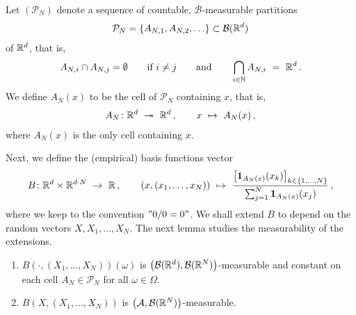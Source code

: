 Let $
\left(
\mathcal{P}_N
\right)
$
denote a sequence of countable, $\mathcal{B}$-measurable partitions 
\begin{align*}
\mathcal{P}_N= \left\{
  A_{N,1},
  A_{N,2},
  \ldots
\right\}
\subset \mathcal{B}(\mathbb{R}^d)
\end{align*}
of $\mathbb{R}^d$, that is, 
\begin{align*}
  A_{N,i}\cap A_{N,j}=\emptyset
  \qquad
  \text{if}\ i\neq j
  \qquad
  \text{and}
  \qquad 
  \bigcap_{i\in\mathbb{N}}A_{N,i}
  \ 
  =
  \ 
  \R^d
  \,.
\end{align*}
We define
$ A_N(x) $ to be the cell of $ \mathcal{P}_N $ containing $x$, that is,
\begin{align*}
  A_N
  \colon
  \R^d 
  \ 
  \twoheadrightarrow 
  \ 
  \R^d  
  \,,\qquad
  x
  \ 
  \mapsto
  \ 
  A_N(x)
  \,,
\end{align*}
where $A_N(x)$ is the only cell containing $x$. 

Next, we define the (empirical) basis functions vector
\begin{align}
  \label{def:basis}
  B\colon
  \R^d\times \R^{d\cdot N}
  \ 
  \to
  \ 
  \R
  \,,
  \qquad
  (x,(x_1,\ldots,x_N))
  \ 
  \mapsto
  \ 
  \frac
  {
    \left[
    \mathbf{1}
    _{
      A_N(x)
    }
    (x_k)
    \right]
    _{k\in \left\{
        1,\ldots,N
    \right\}}
  }
  {
    \sum_{j=1}^N
    \mathbf{1}
    _{
      A_N(x)
    }
    (x_j)
    }
  \,,
\end{align}
where we keep to the convention $"0/0=0"$.
We shall extend $B$ to depend on the random vectors
$X,X_1,\ldots,X_N$.
The next lemma studies the measurability of the extensions.
\begin{lemma}
  \label{lem:basis_meas}
  \quad
  \begin{enumerate}[label=(\roman*)]
\item
  $B(\cdot,(X_1,\ldots,X_N))(\omega)$ is 
  $\left(
    \mathcal{B}(\mathbb{R}^d),\mathcal{B}(\mathbb{R}^N)
  \right)$-measurable
  and
  constant on each cell 
  $A_N\in\mathcal{P}_N$
  for all $\omega\in\Omega$. 
\item
  $B(X,(X_1,\ldots,X_N))$ is $\left(
    \mathcal{A},\mathcal{B}(\mathbb{R}^N)
  \right)$-measurable. 
  \end{enumerate}
\end{lemma}

